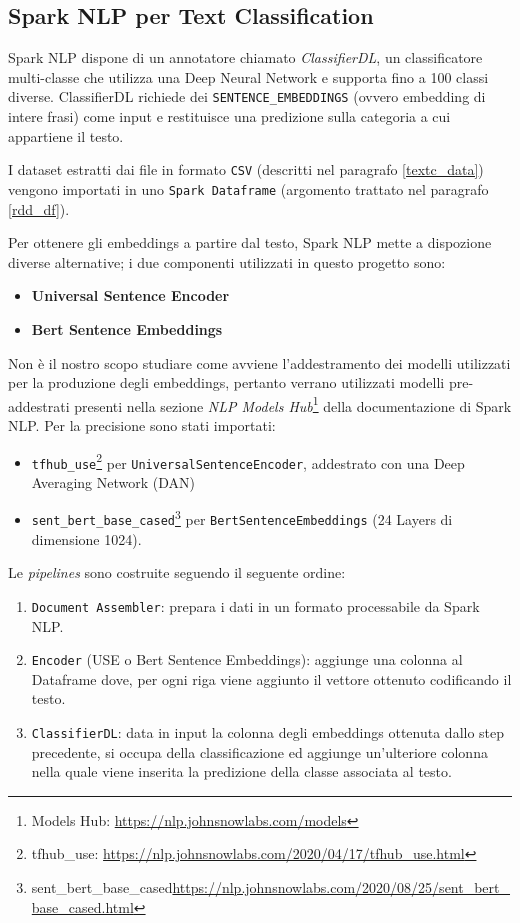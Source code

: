 \subsection{Spark NLP per Text Classification}
Spark NLP dispone di un annotatore chiamato \textit{ClassifierDL}, un classificatore multi-classe che utilizza una Deep Neural Network e supporta fino a 100 classi diverse. ClassifierDL richiede dei \verb|SENTENCE_EMBEDDINGS| (ovvero embedding di intere frasi) come input e restituisce una predizione sulla categoria a cui appartiene il testo.

I dataset estratti dai file in formato \verb|CSV| (descritti nel paragrafo \ref{textc_data}) vengono importati in uno \verb|Spark Dataframe| (argomento trattato nel paragrafo \ref{rdd_df}).

Per ottenere gli embeddings a partire dal testo, Spark NLP mette a dispozione diverse alternative; i due componenti utilizzati in questo progetto sono:
\begin{itemize}
    \item \textbf{Universal Sentence Encoder}
    \item \textbf{Bert Sentence Embeddings}
\end{itemize}
Non è il nostro scopo studiare come avviene l’addestramento dei modelli utilizzati per la produzione degli embeddings, pertanto verrano utilizzati modelli pre-addestrati presenti nella sezione 
\textit{NLP Models Hub}\footnote{Models Hub: \href{https://nlp.johnsnowlabs.com/models}{https://nlp.johnsnowlabs.com/models}} 
della documentazione di Spark NLP. Per la precisione sono stati importati:
\begin{itemize}
    \item \verb|tfhub_use|\footnote{tfhub\_use: \href{https://nlp.johnsnowlabs.com/2020/04/17/tfhub\_use.html}{https://nlp.johnsnowlabs.com/2020/04/17/tfhub\_use.html}} per \verb|UniversalSentenceEncoder|, addestrato con una Deep Averaging Network (DAN)
    \item \verb|sent_bert_base_cased|\footnote{sent\_bert\_base\_cased\href{https://nlp.johnsnowlabs.com/2020/08/25/sent\_bert\_base\_cased.html}{https://nlp.johnsnowlabs.com/2020/08/25/sent\_bert\_base\_cased.html}} per \verb|BertSentenceEmbeddings| (24 Layers di dimensione 1024).
\end{itemize}
Le \textit{pipelines} sono costruite seguendo il seguente ordine:
\begin{enumerate}
    \item \verb|Document Assembler|: prepara i dati in un formato processabile da Spark NLP.
    \item \verb|Encoder| (USE o Bert Sentence Embeddings): aggiunge una colonna al Dataframe dove, per ogni riga viene aggiunto il vettore ottenuto codificando il testo.
    \item \verb|ClassifierDL|: data in input la colonna degli embeddings ottenuta dallo step precedente, si occupa della classificazione ed aggiunge un'ulteriore colonna nella quale viene inserita la predizione della classe associata al testo.
\end{enumerate}